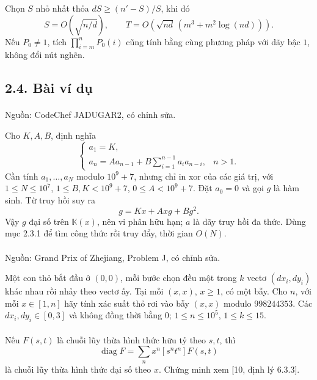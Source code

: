 \documentclass[11pt]{article}
\DeclareMathOperator{\diag}{diag}
\newcommand{\K}{\mathbb{K}}
\begin{document}
Chọn \(S\) nhỏ nhất thỏa \(dS\ge(n'-S)/S\), khi đó
\[
  S=O(\sqrt{n/d}),\qquad
  T=O\left(\sqrt{nd}\,(m^3+m^2\log(nd))\right).
\]
Nếu \(P_0\ne1\), tích \(\prod_{i=m}^{n}P_0(i)\) cũng tính bằng cùng phương
pháp với dãy bậc \(1\), không đổi nút nghẽn.

\subsection*{2.4. Bài ví dụ}

\paragraph{}
Nguồn: CodeChef JADUGAR2, có chỉnh sửa.

Cho \(K,A,B\), định nghĩa
\[
\begin{cases}
a_1=K,\\
a_n=Aa_{n-1}+B\displaystyle\sum_{i=1}^{n-1}a_i a_{n-i},&n>1.
\end{cases}
\]
Cần tính \(a_1,\ldots,a_N\) modulo \(10^9+7\), nhưng chỉ in xor của các giá
trị, với \(1\le N\le10^7\), \(1\le B,K<10^9+7\), \(0\le A<10^9+7\). Đặt
\(a_0=0\) và gọi \(g\) là hàm sinh. Từ truy hồi suy ra
\[
  g=Kx+Axg+Bg^2.
\]
Vậy \(g\) đại số trên \(\K(x)\), nên vi phân hữu hạn; \(a\) là dãy truy hồi
đa thức. Dùng mục 2.3.1 để tìm công thức rồi truy đẩy, thời gian \(O(N)\).

\paragraph{}
Nguồn: Grand Prix of Zhejiang, Problem J, có chỉnh sửa.

Một con thỏ bắt đầu ở \((0,0)\), mỗi bước chọn đều một trong \(k\) vectơ
\((dx_i,dy_i)\) khác nhau rồi nhảy theo vectơ ấy. Tại mỗi \((x,x)\),
\(x\ge1\), có một bẫy. Cho \(n\), với mỗi \(x\in[1,n]\) hãy tính xác suất thỏ
rơi vào bẫy \((x,x)\) modulo \(998244353\). Các \(dx_i,dy_i\in[0,3]\) và
không đồng thời bằng \(0\); \(1\le n\le10^5\), \(1\le k\le15\).

\paragraph{}
Nếu \(F(s,t)\) là chuỗi lũy thừa hình thức hữu tỷ theo \(s,t\), thì
\[
  \diag F=\sum_n x^n[s^nt^n]F(s,t)
\]
là chuỗi lũy thừa hình thức đại số theo \(x\). Chứng minh xem [10, định lý
6.3.3].
\end{document}
